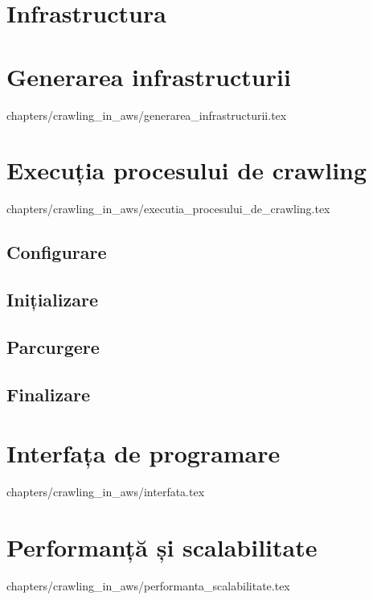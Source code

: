 \documentclass[12pt,oneside]{report}
\begin{document}
\section{Infrastructura}

\clearpage

\section{Generarea infrastructurii}
 {
	chapters/crawling_in_aws/generarea_infrastructurii.tex
}
\clearpage

\section{Execuția procesului de crawling}
 {
	chapters/crawling_in_aws/executia_procesului_de_crawling.tex
}

\subsection{Configurare}

\clearpage

\subsection{Inițializare}


\subsection{Parcurgere}


\subsection{Finalizare}

\clearpage

\section{Interfața de programare}
 {
	chapters/crawling_in_aws/interfata.tex
}

\section{Performanță și scalabilitate}
 {
	chapters/crawling_in_aws/performanta_scalabilitate.tex
}
\clearpage
\end{document}
